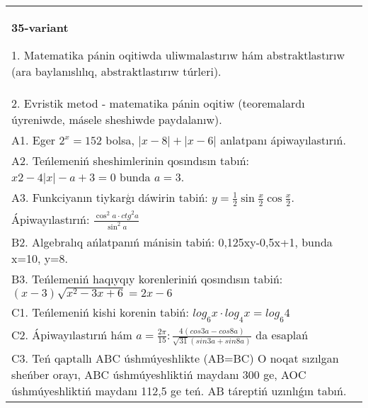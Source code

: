 \documentclass{article}
\begin{document}
\begin{tabular}{m{17cm}}
\textbf{35-variant}

1. Matematika pánin oqitiwda uliwmalastırıw hám abstraktlastırıw (ara baylanıslılıq, abstraktlastırıw túrleri). \\
2. Evristik metod - matematika pánin oqitiw (teoremalardı úyreniwde, másele sheshiwde paydalanıw). \\
A1. Eger \(2^{x} = 152\) bolsa, \(|x - 8| + |x - 6|\) anlatpanı ápiwayılastırıń. \\
A2. Teńlemeniń sheshimlerinin qosındısın tabıń: \(x2 - 4|x| - a + 3 = 0\) bunda \(a = 3\). \\
A3. Funkciyanın tiykarģı dáwirin tabiń: \(y = \frac{1}{2}\sin{\frac{x}{2}\cos\frac{x}{2}}\). \\
Ápiwayılastırıń: \(\frac{\cos^{2}a \cdot {ctg}^{2}a}{\sin^{2}a}\) \\
B2. Algebralıq ańlatpanıń mánisin tabiń: 0,125xy-0,5x+1, bunda x=10, y=8. \\
B3. Teńlemeniń haqıyqıy korenleriniń qosındısın tabiń: \((x-3) \sqrt{x^{2} - 3x + 6} = 2x - 6\) \\
C1. Teńlemeniń kishi korenin tabiń: \(log_{6}x \cdot log_{4}x = log_{6}4\) \\
C2. Ápiwayılastırıń hám \(a = \frac{2\pi}{15}:\frac{4 (cos3a - cos8a) }{\sqrt{31} (sin3a + sin8a) }\) da esaplań \\
C3. Teń qaptallı ABC úshmúyeshlikte (AB=BC) O noqat sızılgan sheńber orayı, ABC úshmúyeshliktiń maydanı 300 ge, AOC úshmúyeshliktiń maydanı 112,5 ge teń. AB táreptiń uzınlıǵın tabıń. \\

\end{tabular}
\vspace{1cm}
\end{document}
